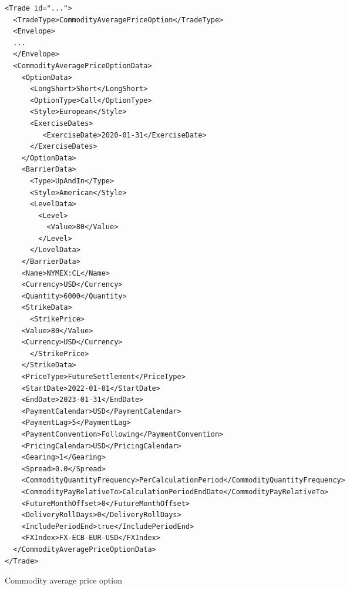 \begin{listing}[h!]
\begin{verbatim}
<Trade id="...">
  <TradeType>CommodityAveragePriceOption</TradeType>
  <Envelope>
  ...
  </Envelope>
  <CommodityAveragePriceOptionData>
    <OptionData>
      <LongShort>Short</LongShort>
      <OptionType>Call</OptionType>
      <Style>European</Style>
      <ExerciseDates>
         <ExerciseDate>2020-01-31</ExerciseDate>
      </ExerciseDates>
    </OptionData>
    <BarrierData>
      <Type>UpAndIn</Type>
      <Style>American</Style>
      <LevelData>
        <Level>
          <Value>80</Value>
        </Level>
      </LevelData>
    </BarrierData>
    <Name>NYMEX:CL</Name>
    <Currency>USD</Currency>
    <Quantity>6000</Quantity>
    <StrikeData>
      <StrikePrice>
	<Value>80</Value>
	<Currency>USD</Currency>
      </StrikePrice>
    </StrikeData>
    <PriceType>FutureSettlement</PriceType>
    <StartDate>2022-01-01</StartDate>
    <EndDate>2023-01-31</EndDate>
    <PaymentCalendar>USD</PaymentCalendar>
    <PaymentLag>5</PaymentLag>
    <PaymentConvention>Following</PaymentConvention>
    <PricingCalendar>USD</PricingCalendar>
    <Gearing>1</Gearing>
    <Spread>0.0</Spread>
    <CommodityQuantityFrequency>PerCalculationPeriod</CommodityQuantityFrequency>
    <CommodityPayRelativeTo>CalculationPeriodEndDate</CommodityPayRelativeTo>
    <FutureMonthOffset>0</FutureMonthOffset>
    <DeliveryRollDays>0</DeliveryRollDays>
    <IncludePeriodEnd>true</IncludePeriodEnd>
    <FXIndex>FX-ECB-EUR-USD</FXIndex>
  </CommodityAveragePriceOptionData>
</Trade>
\end{verbatim}
\caption{Commodity average price option}
\label{lst:commodity_apo}
\end{listing}
